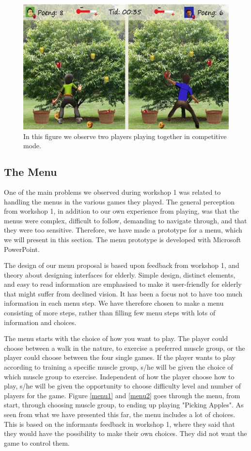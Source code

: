\begin{figure} [H]
\centering
\includegraphics[scale=0.8]{multiplayereple.jpg}
\caption[Picking apples - multi player]{In this figure we observe two players playing together in competitive mode.}
\label{fig:appleMultiplayer}
\end{figure}

\subsection{The Menu}
\label{sec:menu}

One of the main problems we observed during workshop 1 was related to handling the menus in the various games they played. The general perception from workshop 1, in addition to our own experience from playing, was that the menus were complex, difficult to follow, demanding to navigate through, and that they were too sensitive. Therefore, we have made a prototype for a menu, which we will present in this section. The menu prototype is developed with Microsoft PowerPoint.

The design of our menu proposal is based upon feedback from workshop 1, and theory about designing interfaces for elderly. Simple design, distinct elements, and easy to read information are emphasised to make it user-friendly for elderly that might suffer from declined vision. It has been a focus not to have too much information in each menu step. We have therefore chosen to make a menu consisting of more steps, rather than filling few menu steps with lots of information and choices.   

The menu starts with the choice of how you want to play. The player could choose between a walk in the nature, to exercise a preferred muscle group, or the player could choose between the four single games. If the player wants to play according to training a specific muscle group, s/he will be given the choice of which muscle group to exercise. Independent of how the player choose how to play, s/he will be given the opportunity to choose difficulty level and number of players for the game. Figure \ref{menu1} and \ref{menu2} goes through the menu, from start, through choosing muscle group, to ending up playing "Picking Apples". As seen from what we have presented this far, the menu includes a lot of choices. This is based on the informants feedback in workshop 1, where they said that they would have the possibility to make their own choices. They did not want the game to control them.   

